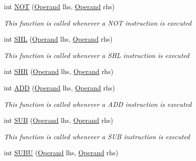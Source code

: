 \begin{DoxyCompactItemize}
int \hyperlink{class_c_p_u___o_s___simulator_1_1_c_p_u_1_1_instruction_ab639a616b188c9816dd1775ebda837d4}{N\+O\+T} (\hyperlink{class_c_p_u___o_s___simulator_1_1_c_p_u_1_1_operand}{Operand} lhs, \hyperlink{class_c_p_u___o_s___simulator_1_1_c_p_u_1_1_operand}{Operand} rhs)
\begin{DoxyCompactList}\small\item\em This function is called whenever a N\+O\+T instruction is executed \end{DoxyCompactList}\item 
int \hyperlink{class_c_p_u___o_s___simulator_1_1_c_p_u_1_1_instruction_ad5e8679e646e772e6fb2d7655bad9f6f}{S\+H\+L} (\hyperlink{class_c_p_u___o_s___simulator_1_1_c_p_u_1_1_operand}{Operand} lhs, \hyperlink{class_c_p_u___o_s___simulator_1_1_c_p_u_1_1_operand}{Operand} rhs)
\begin{DoxyCompactList}\small\item\em This function is called whenever a S\+H\+L instruction is executed \end{DoxyCompactList}\item 
int \hyperlink{class_c_p_u___o_s___simulator_1_1_c_p_u_1_1_instruction_a5796880f8494dab4070d151f3e4b2301}{S\+H\+R} (\hyperlink{class_c_p_u___o_s___simulator_1_1_c_p_u_1_1_operand}{Operand} lhs, \hyperlink{class_c_p_u___o_s___simulator_1_1_c_p_u_1_1_operand}{Operand} rhs)
\item 
int \hyperlink{class_c_p_u___o_s___simulator_1_1_c_p_u_1_1_instruction_a0c627b3cf43f2bf9d196800fbc7dc476}{A\+D\+D} (\hyperlink{class_c_p_u___o_s___simulator_1_1_c_p_u_1_1_operand}{Operand} lhs, \hyperlink{class_c_p_u___o_s___simulator_1_1_c_p_u_1_1_operand}{Operand} rhs)
\begin{DoxyCompactList}\small\item\em This function is called whenever a A\+D\+D instruction is executed \end{DoxyCompactList}\item 
int \hyperlink{class_c_p_u___o_s___simulator_1_1_c_p_u_1_1_instruction_a24caa7b8d57d9fa4e839b45ce2b2816e}{S\+U\+B} (\hyperlink{class_c_p_u___o_s___simulator_1_1_c_p_u_1_1_operand}{Operand} lhs, \hyperlink{class_c_p_u___o_s___simulator_1_1_c_p_u_1_1_operand}{Operand} rhs)
\begin{DoxyCompactList}\small\item\em This function is called whenever a S\+U\+B instruction is executed \end{DoxyCompactList}\item 
int \hyperlink{class_c_p_u___o_s___simulator_1_1_c_p_u_1_1_instruction_a612e041210347726cc65bfa4401af561}{S\+U\+B\+U} (\hyperlink{class_c_p_u___o_s___simulator_1_1_c_p_u_1_1_operand}{Operand} lhs, \hyperlink{class_c_p_u___o_s___simulator_1_1_c_p_u_1_1_operand}{Operand} rhs)

\end{DoxyCompactItemize}
